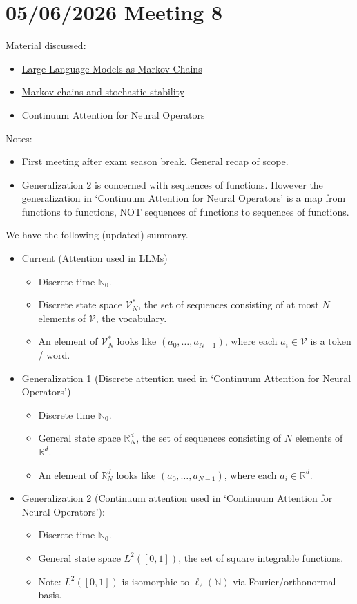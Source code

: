 \documentclass{article}
\begin{document}
\section{05/06/2026 Meeting 8}
Material discussed:
\begin{itemize}
    \item \href{https://arxiv.org/abs/2410.02724}{Large Language Models as Markov Chains}
    \item \href{https://www.cambridge.org/core/books/markov-chains-and-stochastic-stability/E2B82BFB409CD2F7D67AFC5390C565EC}{Markov chains and stochastic stability}
    \item \href{https://arxiv.org/abs/2406.06486}{Continuum Attention for Neural Operators}
\end{itemize}
Notes:
\begin{itemize}
   \item First meeting after exam season break. General recap of scope.
   \item Generalization 2 is concerned with sequences of functions. However the generalization in ‘Continuum Attention for Neural Operators’ is a map from functions to functions, NOT sequences of functions to sequences of functions.
\end{itemize}
We have the following (updated) summary.
\begin{itemize}
    \item Current (Attention used in LLMs)
    \begin{itemize}
        \item Discrete time $\mathbb N_0$.
        \item Discrete state space $\mathcal V^*_N$, the set of sequences consisting of at most $N$ elements of $\mathcal{V}$, the vocabulary.
        \item An element of $\mathcal V^*_N$ looks like $(a_0,\ldots,a_{N-1})$, where each $a_i \in \mathcal V$ is a token / word.
    \end{itemize}
    \item Generalization 1 (Discrete attention used in `Continuum Attention for Neural Operators')
    \begin{itemize}
        \item Discrete time $\mathbb N_0$.
        \item General state space $\mathbb R^d_N$, the set of sequences consisting of $N$ elements of $\mathbb R^d$.
        \item An element of $\mathbb R^d_N$ looks like $(a_0,\ldots,a_{N-1})$, where each $a_i \in \mathbb R^d$.
    \end{itemize}
    \item Generalization 2 (Continuum attention used in `Continuum Attention for Neural Operators'):
    \begin{itemize}
        \item Discrete time $\mathbb N_0$.
        \item General state space $L^2([0,1])$, the set of square integrable functions.
        \item Note: $ L^2([0,1])$ is isomorphic to $\ell_2(\mathbb N)$ via Fourier/orthonormal basis.
    \end{itemize}
\end{itemize}
\end{document}
